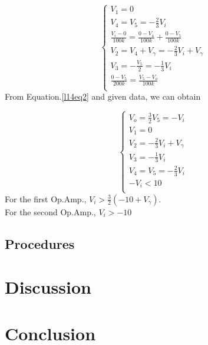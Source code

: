 \begin{itemize}
\begin{equation}
\begin{cases}
                    V_1=0\\
                    V_4=V_5=-\frac{2}{3}V_i\\
                    \frac{V_i-0}{100k}=\frac{0-V_4}{100k}+\frac{0-V_5}{100k}\\
                    V_2=V_4+V_\gamma=-\frac{2}{3}V_i+V_\gamma\\
                    V_3=-\frac{V_5}{2}=-\frac{1}{3}V_i\\
                    \frac{0-V_5}{200k}=\frac{V_5-V_o}{100k}\\
                \end{cases}
                \label{l14eq2}
            \end{equation}
            From Equation.\ref{l14eq2} and given data, we can obtain\par
            \begin{equation*}
                \begin{cases}
                V_o=\frac{3}{2}V_5=-V_i\\
                V_1=0\\
                V_2=-\frac{2}{3}V_i+V_\gamma\\
                V_3=-\frac{1}{3}V_i\\
                V_4=V_5=-\frac{2}{3}V_i\\
                -V_i<10\\
                \end{cases}
            \end{equation*}
            For the first Op.Amp., $V_i>\frac{3}{2}(-10+V_\gamma)$.\\
            For the second Op.Amp., $V_i>-10$\\
    \end{itemize}
    \FloatBarrier
    
    \subsection{Procedures}
    
    
\section{Discussion}


\section{Conclusion}